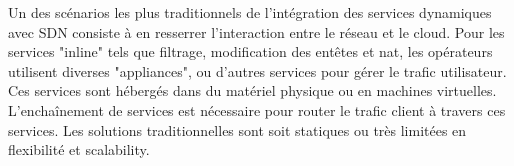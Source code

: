 Un des scénarios les plus traditionnels de l'intégration des services dynamiques avec SDN consiste à en resserrer l'interaction entre le réseau et le cloud. Pour les services "inline" tels que filtrage, modification des entêtes et \gls{nat}, les opérateurs utilisent diverses "appliances", ou d'autres services pour gérer le trafic utilisateur. Ces services sont hébergés dans du matériel physique ou en machines virtuelles. L’enchaînement de services est nécessaire pour router le trafic client à travers ces services. Les solutions traditionnelles sont soit statiques ou très limitées en flexibilité et \gls{scalability}.




